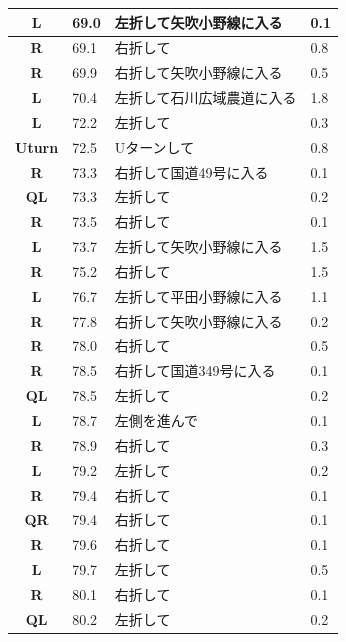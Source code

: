 \documentclass[11pt]{article}
\begin{document}
\begin{center}
\begin{supertabular}{|c|p{0.30in}|p{2.25in}|l|}
 \textbf{L} &  69.0 & 左折して矢吹小野線に入る &   0.1 \\ \hline
{} \textbf{R} &  69.1 & 右折して &   0.8 \\ \hline
{} \textbf{R} &  69.9 & 右折して矢吹小野線に入る &   0.5 \\ \hline
 \textbf{L} &  70.4 & 左折して石川広域農道に入る &   1.8 \\ \hline
 \textbf{L} &  72.2 & 左折して &   0.3 \\ \hline
 \textbf{Uturn} &  72.5 & Uターンして &   0.8 \\ \hline
{} \textbf{R} &  73.3 & 右折して国道49号に入る &   0.1 \\ \hline
 \textbf{QL} &  73.3 & 左折して &   0.2 \\ \hline
{} \textbf{R} &  73.5 & 右折して &   0.1 \\ \hline
 \textbf{L} &  73.7 & 左折して矢吹小野線に入る &   1.5 \\ \hline
{} \textbf{R} &  75.2 & 右折して &   1.5 \\ \hline
 \textbf{L} &  76.7 & 左折して平田小野線に入る &   1.1 \\ \hline
{} \textbf{R} &  77.8 & 右折して矢吹小野線に入る &   0.2 \\ \hline
{} \textbf{R} &  78.0 & 右折して &   0.5 \\ \hline
{} \textbf{R} &  78.5 & 右折して国道349号に入る &   0.1 \\ \hline
 \textbf{QL} &  78.5 & 左折して &   0.2 \\ \hline
 \textbf{L} &  78.7 & 左側を進んで &   0.1 \\ \hline
{} \textbf{R} &  78.9 & 右折して &   0.3 \\ \hline
 \textbf{L} &  79.2 & 左折して &   0.2 \\ \hline
{} \textbf{R} &  79.4 & 右折して &   0.1 \\ \hline
{} \textbf{QR} &  79.4 & 右折して &   0.1 \\ \hline
{} \textbf{R} &  79.6 & 右折して &   0.1 \\ \hline
 \textbf{L} &  79.7 & 左折して &   0.5 \\ \hline
{} \textbf{R} &  80.1 & 右折して &   0.1 \\ \hline
 \textbf{QL} &  80.2 & 左折して &   0.2 \\ \hline

\end{supertabular}
\end{center}
\end{document}
